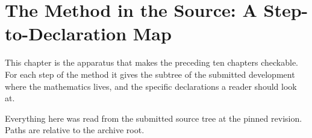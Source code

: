 
\chapter{The Method in the Source: A Step-to-Declaration Map}
\label{ch:map}

This chapter is the apparatus that makes the preceding ten chapters
checkable. For each step of the method it gives the subtree of the submitted
development where the mathematics lives, and the specific declarations a reader
should look at.

Everything here was read from the submitted source tree at the pinned
revision. Paths are relative to the archive root.

